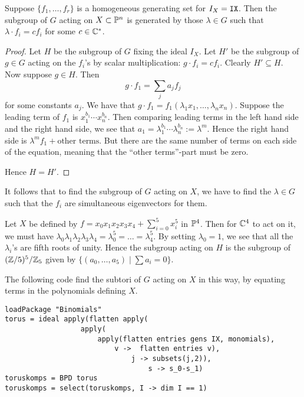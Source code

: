 \begin{lemma}
Suppose $\{ f_1,\ldots, f_r \}$ is a homogeneous generating set for $I_X=\text{\texttt{IX}}$. Then the subgroup of $G$ acting on $X \subset \P^n$ is generated by those $\lambda \in G$ such that $\lambda \cdot f_i  = c f_i$ for some $c \in \C^\ast$.
\end{lemma}
\begin{proof}
Let $H$ be the subgroup of $G$ fixing the ideal $I_X$. Let $H'$ be the subgroup of $g \in G$ acting on the $f_i$'s by scalar multiplication: $g \cdot f_i =c f_i$. Clearly $H' \subseteq H$.  Now suppose $g \in H$. Then
$$
g \cdot f_1 = \sum_j a_j f_j
$$
for some constants $a_j$. We have that $g \cdot f_1 = f_1(\lambda_1 x _1 ,\ldots, \lambda_n x_n)$. Suppose the leading term of $f_1$ is $x_1^{b_1}\cdots x_n^{b_n}$. Then comparing leading terms in the left hand side and the right hand side, we see that $a_1 = \lambda_1^{b_1}\cdots \lambda_n^{b_n} := \lambda^m$. Hence the right hand side is $\lambda^m f_1 + \text{other terms}$. But there are the same number of terms on each side of the equation, meaning that the ``other terms''-part must be zero.

Hence $H=H'$. 
\end{proof}

It follows that to find the subgroup of $G$ acting on $X$, we have to find the $\lambda \in G$ such that the $f_i$ are simultaneous eigenvectors for them.

\begin{example}
\label{example:torus}
Let  $X$ be defined by $f = x_0x_1x_2x_3x_4+\sum_{i=0}^5 x_i^5$ in $\P^4$. Then for $\C^4$ to act on it, we must have $\lambda_0\lambda_1\lambda_2\lambda_3\lambda_4=\lambda_0^5=\ldots=\lambda_4^5$. By setting $\lambda_0=1$, we see that all the $\lambda_i$'s are fifth roots of unity. Hence the subgroup acting on $H$ is the subgroup of $(\Z/5)^5/\Z_5$ given by $\{ (a_0,\ldots,a_5) \mid \sum a_i = 0 \}$.
\end{example}

The following code find the subtori of $G$ acting on $X$ in this way, by equating terms in the polynomials defining $X$.

\begin{lstlisting}[language=Macaulay2]
loadPackage "Binomials"
torus = ideal apply(flatten apply(
                  apply(
                      apply(flatten entries gens IX, monomials),
                          v ->  flatten entries v), 
                              j -> subsets(j,2)),
                                  s -> s_0-s_1)
toruskomps = BPD torus
toruskomps = select(toruskomps, I -> dim I == 1)
\end{lstlisting}

